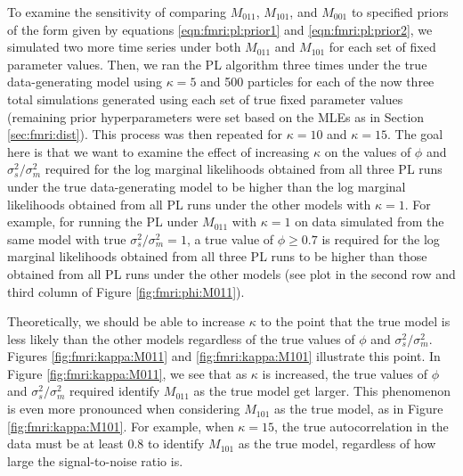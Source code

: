 To examine the sensitivity of comparing $M_{011}$, $M_{101}$, and $M_{001}$ to specified priors of the form given by equations \eqref{eqn:fmri:pl:prior1} and \eqref{eqn:fmri:pl:prior2}, we simulated two more time series under both $M_{011}$ and $M_{101}$ for each set of fixed parameter values. Then, we ran the PL algorithm three times under the true data-generating model using $\kappa = 5$ and 500 particles for each of the now three total simulations generated using each set of true fixed parameter values (remaining prior hyperparameters were set based on the MLEs as in Section \ref{sec:fmri:dist}). This process was then repeated for $\kappa = 10$ and $\kappa = 15$. The goal here is that we want to examine the effect of increasing $\kappa$ on the values of $\phi$ and $\sigma^2_s / \sigma^2_m$ required for the log marginal likelihoods obtained from all three PL runs under the true data-generating model to be higher than the log marginal likelihoods obtained from all PL runs under the other models with $\kappa = 1$. For example, for running the PL under $M_{011}$ with $\kappa = 1$ on data simulated from the same model with true $\sigma^2_s / \sigma^2_m = 1$, a true value of $\phi \ge 0.7$ is required for the log marginal likelihoods obtained from all three PL runs to be higher than those obtained from all PL runs under the other models (see plot in the second row and third column of Figure \ref{fig:fmri:phi:M011}).

Theoretically, we should be able to increase $\kappa$ to the point that the true model is less likely than the other models regardless of the true values of $\phi$ and $\sigma^2_s / \sigma^2_m$. Figures \ref{fig:fmri:kappa:M011} and \ref{fig:fmri:kappa:M101} illustrate this point. In Figure \ref{fig:fmri:kappa:M011}, we see that as $\kappa$ is increased, the true values of $\phi$ and $\sigma^2_s / \sigma^2_m$ required identify $M_{011}$ as the true model get larger. This phenomenon is even more pronounced when considering $M_{101}$ as the true model, as in Figure \ref{fig:fmri:kappa:M101}. For example, when $\kappa = 15$, the true autocorrelation in the data must be at least 0.8 to identify $M_{101}$ as the true model, regardless of how large the signal-to-noise ratio is.

